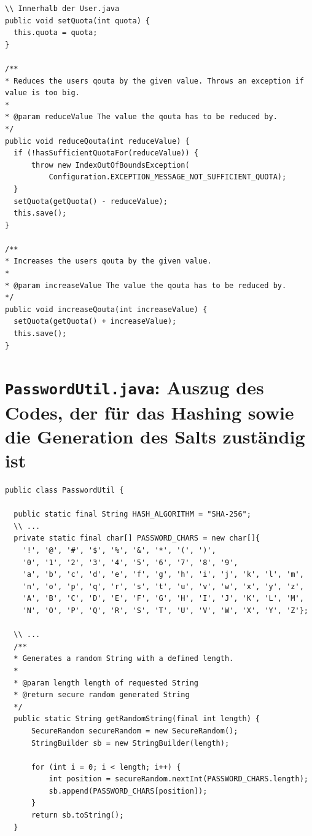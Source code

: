 \documentclass[12pt,DIV14,BCOR10mm,a4paper,parskip=half-,headsepline,headinclude,english,ngerman,bibliography=totocnumbered]{scrreprt}
\begin{document}
\begin{appendices}
\begin{lstlisting}
\\ Innerhalb der User.java
public void setQuota(int quota) {
  this.quota = quota;
}

/**
* Reduces the users qouta by the given value. Throws an exception if value is too big.
*
* @param reduceValue The value the qouta has to be reduced by.
*/
public void reduceQouta(int reduceValue) {
  if (!hasSufficientQuotaFor(reduceValue)) {
      throw new IndexOutOfBoundsException(
          Configuration.EXCEPTION_MESSAGE_NOT_SUFFICIENT_QUOTA);
  }
  setQuota(getQuota() - reduceValue);
  this.save();
}

/**
* Increases the users qouta by the given value.
*
* @param increaseValue The value the qouta has to be reduced by.
*/
public void increaseQouta(int increaseValue) {
  setQuota(getQuota() + increaseValue);
  this.save();
}
\end{lstlisting}

\section{\texttt{PasswordUtil.java}: Auszug des Codes, der für das Hashing sowie die Generation des Salts zuständig ist}

\label{hashing-salt-gen-fail}
\begin{lstlisting}
public class PasswordUtil {

  public static final String HASH_ALGORITHM = "SHA-256";
  \\ ...
  private static final char[] PASSWORD_CHARS = new char[]{
    '!', '@', '#', '$', '%', '&', '*', '(', ')',
    '0', '1', '2', '3', '4', '5', '6', '7', '8', '9',
    'a', 'b', 'c', 'd', 'e', 'f', 'g', 'h', 'i', 'j', 'k', 'l', 'm',
    'n', 'o', 'p', 'q', 'r', 's', 't', 'u', 'v', 'w', 'x', 'y', 'z',
    'A', 'B', 'C', 'D', 'E', 'F', 'G', 'H', 'I', 'J', 'K', 'L', 'M',
    'N', 'O', 'P', 'Q', 'R', 'S', 'T', 'U', 'V', 'W', 'X', 'Y', 'Z'};

  \\ ...
  /**
  * Generates a random String with a defined length.
  *
  * @param length length of requested String
  * @return secure random generated String
  */
  public static String getRandomString(final int length) {
      SecureRandom secureRandom = new SecureRandom();
      StringBuilder sb = new StringBuilder(length);

      for (int i = 0; i < length; i++) {
          int position = secureRandom.nextInt(PASSWORD_CHARS.length);
          sb.append(PASSWORD_CHARS[position]);
      }
      return sb.toString();
  }


\end{lstlisting}
\end{appendices}
\end{document}
